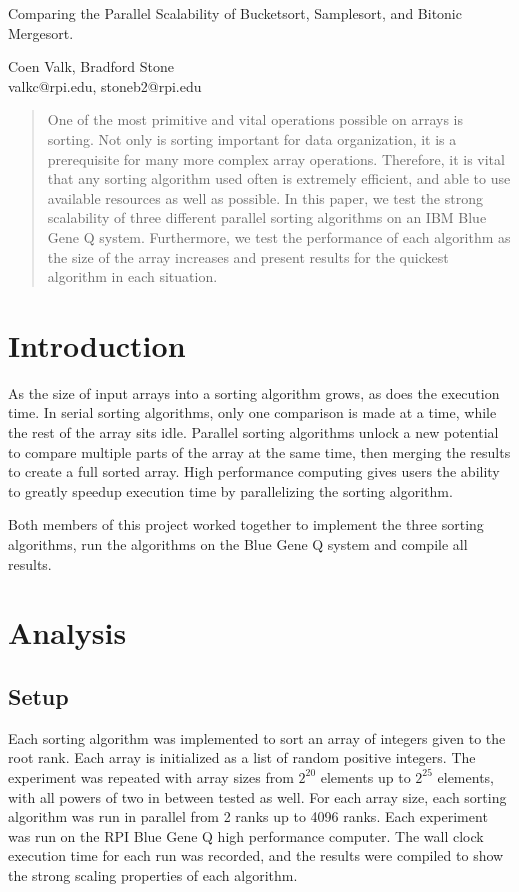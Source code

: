\documentclass[10pt,letterpaper]{article}
\begin{document}
\begin{center}
\begin{huge}
Comparing the Parallel Scalability of Bucketsort, Samplesort, and Bitonic Mergesort.\\
\end{huge}
\vspace{0.25in}
\begin{large}
Coen Valk, Bradford Stone\\
valkc@rpi.edu, stoneb2@rpi.edu\\
\end{large}
\end{center}
\vspace{0.25in}
\begin{multicols}{2}
\begin{abstract}
One of the most primitive and vital operations possible on arrays is sorting. Not only is sorting important for data organization, it is a prerequisite for many more complex array operations. Therefore, it is vital that any sorting algorithm used often is extremely efficient, and able to use available resources as well as possible. In this paper, we test the strong scalability of three different parallel sorting algorithms on an IBM Blue Gene Q system. Furthermore, we test the performance of each algorithm as the size of the array increases and present results for the quickest algorithm in each situation.
\end{abstract}
\section{Introduction}
As the size of input arrays into a sorting algorithm grows, as does the execution time. In serial sorting algorithms, only one comparison is made at a time, while the rest of the array sits idle. Parallel sorting algorithms unlock a new potential to compare multiple parts of the array at the same time, then merging the results to create a full sorted array. High performance computing gives users the ability to greatly speedup execution time by parallelizing the sorting algorithm.

Both members of this project worked together to implement the three sorting algorithms, run the algorithms on the Blue Gene Q system and compile all results.
\section{Analysis}
\subsection{Setup}
Each sorting algorithm was implemented to sort an array of integers given to the root rank. Each array is initialized as a list of random positive integers. The experiment was repeated with array sizes from $2^{20}$ elements up to $2^{25}$ elements, with all powers of two in between tested as well. For each array size, each sorting algorithm was run in parallel from 2 ranks up to 4096 ranks. Each experiment was run on the RPI Blue Gene Q high performance computer. The wall clock execution time for each run was recorded, and the results were compiled to show the strong scaling properties of each algorithm.

\end{multicols}
\end{document}
